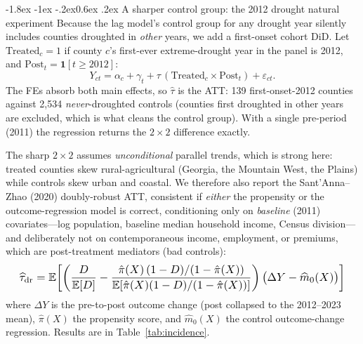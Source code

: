 \documentclass[11pt]{article}
\makeatletter
\renewcommand\subsection{\@startsection{subsection}{2}{\z@}%
  {-1.8ex \@plus -1ex \@minus -.2ex}{0.6ex \@plus .2ex}%
  {\normalfont\normalsize\bfseries}}
\makeatother
\begin{document}
\subsection{A sharper control group: the 2012 drought natural experiment}
Because the lag model's control group for any drought year silently includes
counties droughted in \emph{other} years, we add a first-onset cohort DiD. Let
$\text{Treated}_c=1$ if county $c$'s first-ever extreme-drought year in the panel is
2012, and $\text{Post}_t=\mathbf 1[t\ge2012]$:
\begin{equation}
Y_{ct}=\alpha_c+\gamma_t+\tau\,(\text{Treated}_c\times\text{Post}_t)+\varepsilon_{ct}.
\label{eq:did}
\end{equation}
The FEs absorb both main effects, so $\hat\tau$ is the ATT: 139 first-onset-2012
counties against 2{,}534 \emph{never}-droughted controls (counties first droughted in
other years are excluded, which is what cleans the control group). With a single
pre-period (2011) the regression returns the $2\times2$ difference exactly.

The sharp $2\times2$ assumes \emph{unconditional} parallel trends, which is strong
here: treated counties skew rural-agricultural (Georgia, the Mountain West, the
Plains) while controls skew urban and coastal. We therefore also report the
Sant'Anna--Zhao (2020) doubly-robust ATT, consistent if \emph{either} the propensity
or the outcome-regression model is correct, conditioning only on \emph{baseline}
(2011) covariates---log population, baseline median household income, Census
division---and deliberately not on contemporaneous income, employment, or premiums,
which are post-treatment mediators (bad controls):
\begin{equation}
\resizebox{0.96\hsize}{!}{$\displaystyle
\widehat\tau_{\mathrm{dr}}=\mathbb E\!\left[\left(\frac{D}{\mathbb E[D]}
-\frac{\hat\pi(X)\,(1-D)/(1-\hat\pi(X))}
       {\mathbb E\!\left[\hat\pi(X)(1-D)/(1-\hat\pi(X))\right]}\right)
\bigl(\Delta Y-\widehat m_0(X)\bigr)\right]$}
\label{eq:drdid}
\end{equation}
where $\Delta Y$ is the pre-to-post outcome change (post collapsed to the 2012--2023
mean), $\hat\pi(X)$ the propensity score, and $\widehat m_0(X)$ the control
outcome-change regression. Results are in Table~\ref{tab:incidence}.
\end{document}

